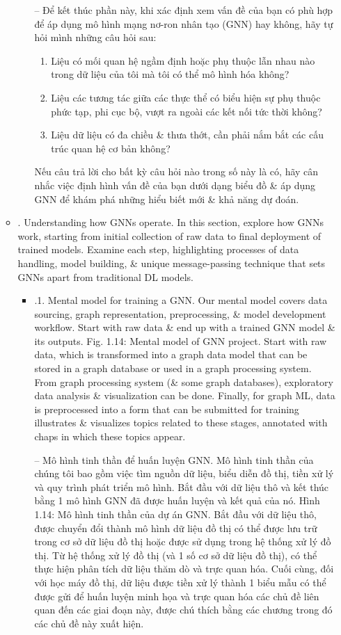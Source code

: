 \documentclass{article}
\begin{document}
\begin{itemize}
\begin{itemize}
\begin{itemize}
            -- Để kết thúc phần này, khi xác định xem vấn đề của bạn có phù hợp để áp dụng mô hình mạng nơ-ron nhân tạo (GNN) hay không, hãy tự hỏi mình những câu hỏi sau:
            \begin{enumerate}
                \item Liệu có mối quan hệ ngầm định hoặc phụ thuộc lẫn nhau nào trong dữ liệu của tôi mà tôi có thể mô hình hóa không?
                \item Liệu các tương tác giữa các thực thể có biểu hiện sự phụ thuộc phức tạp, phi cục bộ, vượt ra ngoài các kết nối tức thời không?
                \item Liệu dữ liệu có đa chiều \& thưa thớt, cần phải nắm bắt các cấu trúc quan hệ cơ bản không?
            \end{enumerate}
            Nếu câu trả lời cho bất kỳ câu hỏi nào trong số này là có, hãy cân nhắc việc định hình vấn đề của bạn dưới dạng biểu đồ \& áp dụng GNN để khám phá những hiểu biết mới \& khả năng dự đoán.
        \end{itemize}
        \item {. Understanding how GNNs operate.} In this section, explore how GNNs work, starting from initial collection of raw data to final deployment of trained models. Examine each step, highlighting processes of data handling, model building, \& unique message-passing technique that sets GNNs apart from traditional DL models.
        \begin{itemize}
            \item {.1. Mental model for training a GNN.} Our mental model covers data sourcing, graph representation, preprocessing, \& model development workflow. Start with raw data \& end up with a trained GNN model \& its outputs. {\sf Fig. 1.14: Mental model of GNN project. Start with raw data, which is transformed into a graph data model that can be stored in a graph database or used in a graph processing system. From graph processing system (\& some graph databases), exploratory data analysis \& visualization can be done. Finally, for graph ML, data is preprocessed into a form that can be submitted for training} illustrates \& visualizes topics related to these stages, annotated with chaps in which these topics appear.

            -- {\sf Mô hình tinh thần để huấn luyện GNN.} Mô hình tinh thần của chúng tôi bao gồm việc tìm nguồn dữ liệu, biểu diễn đồ thị, tiền xử lý và quy trình phát triển mô hình. Bắt đầu với dữ liệu thô và kết thúc bằng 1 mô hình GNN đã được huấn luyện và kết quả của nó. {\sf Hình 1.14: Mô hình tinh thần của dự án GNN. Bắt đầu với dữ liệu thô, được chuyển đổi thành mô hình dữ liệu đồ thị có thể được lưu trữ trong cơ sở dữ liệu đồ thị hoặc được sử dụng trong hệ thống xử lý đồ thị. Từ hệ thống xử lý đồ thị (và 1 số cơ sở dữ liệu đồ thị), có thể thực hiện phân tích dữ liệu thăm dò và trực quan hóa. Cuối cùng, đối với học máy đồ thị, dữ liệu được tiền xử lý thành 1 biểu mẫu có thể được gửi để huấn luyện} minh họa và trực quan hóa các chủ đề liên quan đến các giai đoạn này, được chú thích bằng các chương trong đó các chủ đề này xuất hiện.


\end{itemize}
\end{itemize}
\end{itemize}
\end{document}

